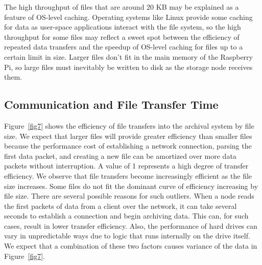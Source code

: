 The high throughput of files that are around 20 KB may be explained as a feature of OS-level caching.  Operating systems like Linux provide some caching for data as user-space applications interact with the file system, so the high throughput for some files may reflect a sweet spot between the efficiency of repeated data transfers and the speedup of OS-level caching for files up to a certain limit in size.  Larger files don't fit in the main memory of the Raspberry Pi, so large files must inevitably be written to disk as the storage node receives them.

\subsection{Communication and File Transfer Time}
Figure~\ref{fig7} shows the efficiency of file transfers into the archival system by file size.  We expect that larger files will provide greater efficiency than smaller files because the performance cost of establishing a network connection, parsing the first data packet, and creating a new file can be amortized over more data packets without interruption.   A value of 1 represents a high degree of transfer efficiency.  We observe that file transfers become increasingly efficient as the file size increases.  Some files do not fit the dominant curve of efficiency increasing by file size.  There are several possible reasons for such outliers.  When a node reads the first packets of data from a client over the network, it can take several seconds to establish a connection and begin archiving data.  This can, for such cases, result in lower transfer efficiency.  Also, the performance of hard drives can vary in unpredictable ways due to logic that runs internally on the drive itself.  We expect that a combination of these two factors causes variance of the data in Figure~\ref{fig7}.

